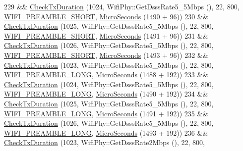 \begin{DoxyCode}
229     && \hyperlink{classTxDurationTest_ac86b852957ecf1a1bed4f4e48debb30e}{CheckTxDuration} (1024, WifiPhy::GetDsssRate5\_5Mbps (), 22, 800, 
      \hyperlink{group__wifi_gga5e94a56cb338a14ffbbb19c6a41251ebab9a39ca1f62d36c33ac489c4cf59745b}{WIFI\_PREAMBLE\_SHORT}, \hyperlink{group__timecivil_ga17465a639c8d1464e76538afdd78a9f0}{MicroSeconds} (1490 + 96))
230     && \hyperlink{classTxDurationTest_ac86b852957ecf1a1bed4f4e48debb30e}{CheckTxDuration} (1025, WifiPhy::GetDsssRate5\_5Mbps (), 22, 800, 
      \hyperlink{group__wifi_gga5e94a56cb338a14ffbbb19c6a41251ebab9a39ca1f62d36c33ac489c4cf59745b}{WIFI\_PREAMBLE\_SHORT}, \hyperlink{group__timecivil_ga17465a639c8d1464e76538afdd78a9f0}{MicroSeconds} (1491 + 96))
231     && \hyperlink{classTxDurationTest_ac86b852957ecf1a1bed4f4e48debb30e}{CheckTxDuration} (1026, WifiPhy::GetDsssRate5\_5Mbps (), 22, 800, 
      \hyperlink{group__wifi_gga5e94a56cb338a14ffbbb19c6a41251ebab9a39ca1f62d36c33ac489c4cf59745b}{WIFI\_PREAMBLE\_SHORT}, \hyperlink{group__timecivil_ga17465a639c8d1464e76538afdd78a9f0}{MicroSeconds} (1493 + 96))
232     && \hyperlink{classTxDurationTest_ac86b852957ecf1a1bed4f4e48debb30e}{CheckTxDuration} (1023, WifiPhy::GetDsssRate5\_5Mbps (), 22, 800, 
      \hyperlink{group__wifi_gga5e94a56cb338a14ffbbb19c6a41251eba12f3d9468d1630bd38bbef20df1e3eda}{WIFI\_PREAMBLE\_LONG}, \hyperlink{group__timecivil_ga17465a639c8d1464e76538afdd78a9f0}{MicroSeconds} (1488 + 192))
233     && \hyperlink{classTxDurationTest_ac86b852957ecf1a1bed4f4e48debb30e}{CheckTxDuration} (1024, WifiPhy::GetDsssRate5\_5Mbps (), 22, 800, 
      \hyperlink{group__wifi_gga5e94a56cb338a14ffbbb19c6a41251eba12f3d9468d1630bd38bbef20df1e3eda}{WIFI\_PREAMBLE\_LONG}, \hyperlink{group__timecivil_ga17465a639c8d1464e76538afdd78a9f0}{MicroSeconds} (1490 + 192))
234     && \hyperlink{classTxDurationTest_ac86b852957ecf1a1bed4f4e48debb30e}{CheckTxDuration} (1025, WifiPhy::GetDsssRate5\_5Mbps (), 22, 800, 
      \hyperlink{group__wifi_gga5e94a56cb338a14ffbbb19c6a41251eba12f3d9468d1630bd38bbef20df1e3eda}{WIFI\_PREAMBLE\_LONG}, \hyperlink{group__timecivil_ga17465a639c8d1464e76538afdd78a9f0}{MicroSeconds} (1491 + 192))
235     && \hyperlink{classTxDurationTest_ac86b852957ecf1a1bed4f4e48debb30e}{CheckTxDuration} (1026, WifiPhy::GetDsssRate5\_5Mbps (), 22, 800, 
      \hyperlink{group__wifi_gga5e94a56cb338a14ffbbb19c6a41251eba12f3d9468d1630bd38bbef20df1e3eda}{WIFI\_PREAMBLE\_LONG}, \hyperlink{group__timecivil_ga17465a639c8d1464e76538afdd78a9f0}{MicroSeconds} (1493 + 192))
236     && \hyperlink{classTxDurationTest_ac86b852957ecf1a1bed4f4e48debb30e}{CheckTxDuration} (1023, WifiPhy::GetDsssRate2Mbps (), 22, 800, 

\end{DoxyCode}
